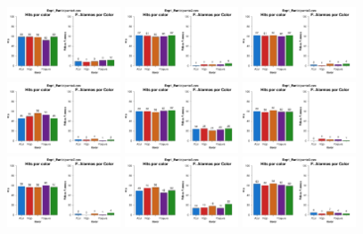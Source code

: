\begin{figure}[th]
\centering
\includegraphics[width=0.30\textwidth]{Figures/Color_Exp1_P1} \includegraphics[width=0.30\textwidth]{Figures/Color_Exp1_P2} \includegraphics[width=0.30\textwidth]{Figures/Color_Exp1_P3}
\includegraphics[width=0.30\textwidth]{Figures/Color_Exp1_P4} \includegraphics[width=0.30\textwidth]{Figures/Color_Exp1_P5} \includegraphics[width=0.30\textwidth]{Figures/Color_Exp1_P6}
\includegraphics[width=0.30\textwidth]{Figures/Color_Exp1_P7} \includegraphics[width=0.30\textwidth]{Figures/Color_Exp1_P8} \includegraphics[width=0.30\textwidth]{Figures/Color_Exp1_P9}

\end{figure}
